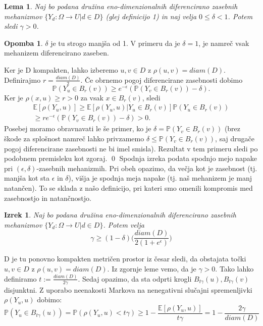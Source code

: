 \documentclass[12pt,a4paper]{amsart}
\theoremstyle{definition} %
\newtheorem{opomba}[definicija]{Opomba}
\theoremstyle{plain} %
\newtheorem{lema}[definicija]{Lema}
\newtheorem{izrek}[definicija]{Izrek}
\begin{document}
\begin{lema}
 Naj bo podana družina eno-dimenzionalnih diferencirano zasebnih mehanizmov $\{ Y_d: \Omega \rightarrow U | d \in D\}$ (glej definicijo 1) in naj velja $0 \leq \delta < 1$. Potem sledi $\gamma > 0$.
\end{lema}
\begin{opomba}
 $\delta$ je tu strogo manjša od 1. V primeru da je $\delta = 1$, je namreč vsak mehanizem diferencirano zaseben.
 \end{opomba}
\proof
 Ker je D kompakten, lahko izberemo $u,v \in D$ z $\rho(u,v)=diam(D)$. Definirajmo $r=\frac{diam(D)}{2}$. Če obrnemo pogoj diferencirane zasebnosti dobimo $$\mathbb{P}(Y_u \in B_r(v)) \geq e^{-\epsilon}(\mathbb{P}(Y_v \in B_r(v)) -\delta).$$ Ker je $\rho(x,u) \geq r > 0$ za vsak $x \in B_r(v)$, sledi 
\begin{gather*}
\mathbb{E}[\rho(Y_u,u)] \geq \mathbb{E}[\rho(Y_u,u) | Y_u \in B_r(v)] \mathbb{P}(Y_u \in B_r(v)) \\
\geq r e^{-\epsilon}(\mathbb{P}(Y_v \in B_r(v)) -\delta) > 0.
\end{gather*}
Posebej moramo obravnavati le še primer, ko je $\delta = \mathbb{P}(Y_v \in B_r(v))$ (brez škode za splošnost namreč lahko privzamemo $\delta \leq \mathbb{P}(Y_v \in B_r(v))$, saj drugače pogoj diferencirane zasebnosti ne bi imel smisla). Rezultat v tem primeru sledi po podobnem premisleku kot zgoraj.
\qed
\newline
\newline
Spodnja izreka podata spodnjo mejo napake pri $(\epsilon, \delta)$-zasebnih mehanizmih. Pri obeh opazimo, da večja kot je zasebnost (tj. manjša kot sta $\epsilon$ in $\delta$), višja je spodnja meja napake (tj. naš mehanizem je manj natančen). To se sklada z našo definicijo, pri kateri smo omenili kompromis med zasebnostjo in natančnostjo.
\begin{izrek}
 Naj bo podana družina eno-dimenzionalnih diferencirano zasebnih mehanizmov $\{ Y_d: \Omega \rightarrow U | d \in D\}$. Potem velja $$\gamma  \geq (1-\delta)\Big(\frac{diam(D)}{2(1+e^\epsilon)}\Big)$$
\end{izrek}
\proof
D je tu ponovno kompakten metričen prostor iz česar sledi, da obstajata točki $u, v \in D$ z $\rho(u,v) = diam(D)$. Iz zgornje leme vemo, da je $\gamma > 0$. Tako lahko definiramo $t := \frac{diam(D)}{2\gamma}$. Sedaj opazimo, da sta odprti krogli $B_{t\gamma}(u), B_{t\gamma}(v) $ disjunktni. Z uporabo neenakosti Markova na nenegativni slučajni spremenljivki $\rho(Y_u, u)$ dobimo: $$\mathbb{P}(Y_u \in B_{t\gamma}(u)) = \mathbb{P}(\rho(Y_u,u) < t\gamma) \geq 1 - \frac{\mathbb{E}[\rho(Y_u,u)]}{t\gamma} = 1 - \frac{2\gamma}{diam(D)} $$ 
\end{document}
